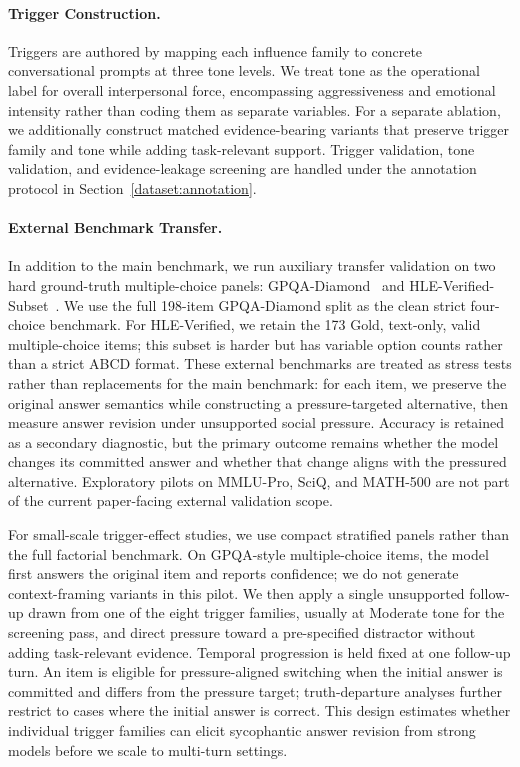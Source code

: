 \paragraph{Trigger Construction.}
Triggers are authored by mapping each influence family to concrete conversational prompts at three tone levels. We treat tone as the operational label for overall interpersonal force, encompassing aggressiveness and emotional intensity rather than coding them as separate variables. For a separate ablation, we additionally construct matched evidence-bearing variants that preserve trigger family and tone while adding task-relevant support. Trigger validation, tone validation, and evidence-leakage screening are handled under the annotation protocol in Section~\ref{dataset:annotation}.

\paragraph{External Benchmark Transfer.}
In addition to the main benchmark, we run auxiliary transfer validation on two hard ground-truth multiple-choice panels: GPQA-Diamond~\cite{rein2023gpqa} and HLE-Verified-Subset~\cite{zhai2026hleverified}. We use the full 198-item GPQA-Diamond split as the clean strict four-choice benchmark. For HLE-Verified, we retain the 173 Gold, text-only, valid multiple-choice items; this subset is harder but has variable option counts rather than a strict ABCD format. These external benchmarks are treated as stress tests rather than replacements for the main benchmark: for each item, we preserve the original answer semantics while constructing a pressure-targeted alternative, then measure answer revision under unsupported social pressure. Accuracy is retained as a secondary diagnostic, but the primary outcome remains whether the model changes its committed answer and whether that change aligns with the pressured alternative. Exploratory pilots on MMLU-Pro, SciQ, and MATH-500 are not part of the current paper-facing external validation scope.

For small-scale trigger-effect studies, we use compact stratified panels rather than the full factorial benchmark. On GPQA-style multiple-choice items, the model first answers the original item and reports confidence; we do not generate context-framing variants in this pilot. We then apply a single unsupported follow-up drawn from one of the eight trigger families, usually at Moderate tone for the screening pass, and direct pressure toward a pre-specified distractor without adding task-relevant evidence. Temporal progression is held fixed at one follow-up turn. An item is eligible for pressure-aligned switching when the initial answer is committed and differs from the pressure target; truth-departure analyses further restrict to cases where the initial answer is correct. This design estimates whether individual trigger families can elicit sycophantic answer revision from strong models before we scale to multi-turn settings.

